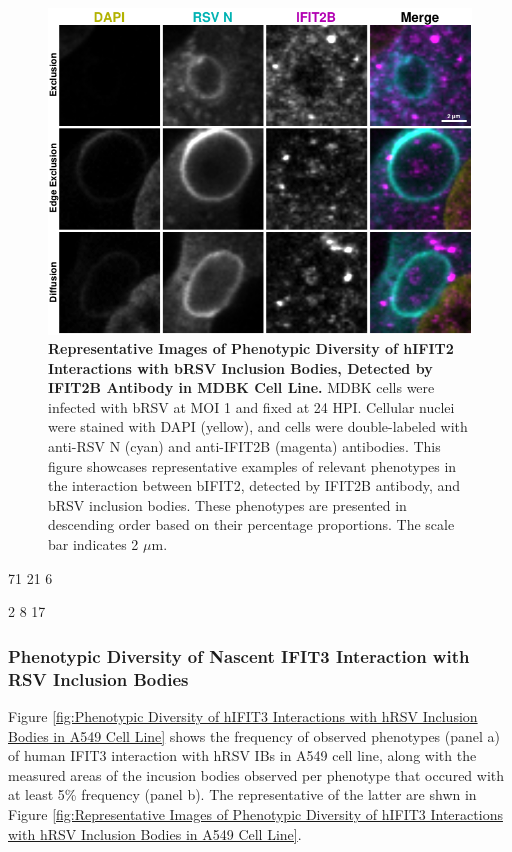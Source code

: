 \begin{figure}
    \centering
    \includegraphics[width=1\linewidth]{08. Chapter 3/Figs/02. Infection/02. IFIT2/02. IFIT2B/12. i2b mdbk brsv.pdf} 
    \caption[Representative Images of Phenotypic Diversity of hIFIT2 Interactions with bRSV Inclusion Bodies, Detected by IFIT2B Antibody in MDBK Cell Line.]{\textbf{Representative Images of Phenotypic Diversity of hIFIT2 Interactions with bRSV Inclusion Bodies, Detected by IFIT2B Antibody in MDBK Cell Line.} MDBK cells were infected with bRSV at MOI 1 and fixed at 24 HPI. Cellular nuclei were stained with DAPI (yellow), and cells were double-labeled with anti-RSV N (cyan) and anti-IFIT2B (magenta) antibodies. This figure showcases representative examples of relevant phenotypes in the interaction between bIFIT2, detected by IFIT2B antibody, and bRSV inclusion bodies. These phenotypes are presented in descending order based on their percentage proportions. The scale bar indicates 2 \(\mu \mbox{m}\).}
    \label{fig:Representative Images of Phenotypic Diversity of hIFIT2 Interactions with bRSV Inclusion Bodies, Detected by IFIT2B Antibody in MDBK Cell Line}
\end{figure}

71 21 6

2 8 17

\subsubsection{Phenotypic Diversity of Nascent IFIT3 Interaction with RSV Inclusion Bodies}
Figure \ref{fig:Phenotypic Diversity of hIFIT3 Interactions with hRSV Inclusion Bodies in A549 Cell Line} shows the frequency of observed phenotypes (panel a) of human IFIT3 interaction with hRSV IBs in A549 cell line, along with the measured areas of the incusion bodies observed per phenotype that occured with at least 5\% frequency (panel b). The representative of the latter are shwn in Figure \ref{fig:Representative Images of Phenotypic Diversity of hIFIT3 Interactions with hRSV Inclusion Bodies in A549 Cell Line}.

